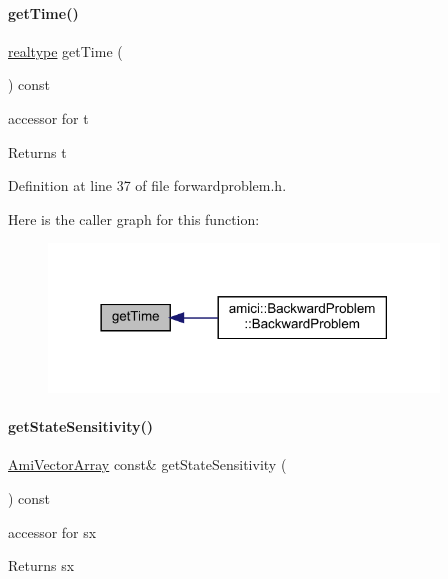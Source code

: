 \paragraph{\texorpdfstring{get\+Time()}{getTime()}}
{\footnotesize\ttfamily \mbox{\hyperlink{namespaceamici_a1bdce28051d6a53868f7ccbf5f2c14a3}{realtype}} get\+Time (\begin{DoxyParamCaption}{ }\end{DoxyParamCaption}) const}

accessor for t \begin{DoxyReturn}{Returns}
t 
\end{DoxyReturn}


Definition at line 37 of file forwardproblem.\+h.

Here is the caller graph for this function\+:
\nopagebreak
\begin{figure}[H]
\begin{center}
\leavevmode
\includegraphics[width=294pt]{classamici_1_1_forward_problem_a1bc77462943aa0bae032ffa5d6e887ee_icgraph}
\end{center}
\end{figure}
\mbox{\label{classamici_1_1_forward_problem_a3c364a12c650f9f247f664cedb6d81d3}} 
\paragraph{\texorpdfstring{get\+State\+Sensitivity()}{getStateSensitivity()}}
{\footnotesize\ttfamily \mbox{\hyperlink{classamici_1_1_ami_vector_array}{Ami\+Vector\+Array}} const\& get\+State\+Sensitivity (\begin{DoxyParamCaption}{ }\end{DoxyParamCaption}) const}

accessor for sx \begin{DoxyReturn}{Returns}
sx 
\end{DoxyReturn}



